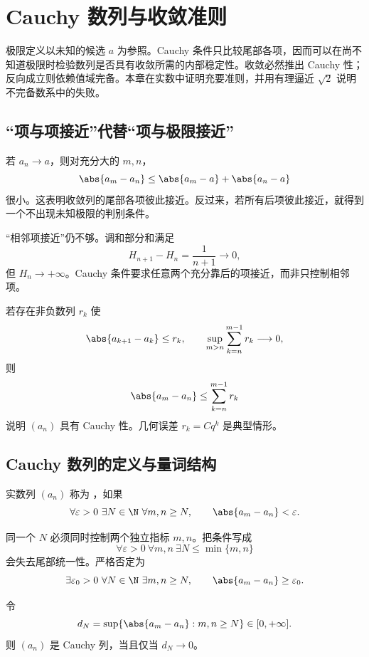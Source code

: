 \chapter{Cauchy 数列与收敛准则}
\label{chap:cauchy-criterion}

\begin{chapterguide}
极限定义以未知的候选 \(a\) 为参照。Cauchy 条件只比较尾部各项，因而可以在尚不知道极限时检验数列是否具有收敛所需的内部稳定性。收敛必然推出 Cauchy 性；反向成立则依赖值域完备。本章在实数中证明充要准则，并用有理逼近 \(\sqrt2\) 说明不完备数系中的失败。
\end{chapterguide}

\section{“项与项接近”代替“项与极限接近”}

若 \(a_n\to a\)，则对充分大的 \(m,n\)，
\[
 \abs{a_m-a_n}
 \le\abs{a_m-a}+\abs{a_n-a}
\]
很小。这表明收敛列的尾部各项彼此接近。反过来，若所有后项彼此接近，就得到一个不出现未知极限的判别条件。

“相邻项接近”仍不够。调和部分和满足
\[
 H_{n+1}-H_n=\frac1{n+1}\to0,
\]
但 \(H_n\to+\infty\)。Cauchy 条件要求任意两个充分靠后的项接近，而非只控制相邻项。

\begin{example}
若存在非负数列 \(r_k\) 使
\[
 \abs{a_{k+1}-a_k}\le r_k,\qquad
 \sup_{m>n}\sum_{k=n}^{m-1}r_k\longrightarrow0,
\]
则
\[
 \abs{a_m-a_n}\le\sum_{k=n}^{m-1}r_k
\]
说明 \((a_n)\) 具有 Cauchy 性。几何误差 \(r_k=Cq^k\) 是典型情形。
\end{example}

\section{Cauchy 数列的定义与量词结构}

\begin{definition}
实数列 \((a_n)\) 称为 ，如果
\[
 \forall\varepsilon>0\ \exists N\in\N\
 \forall m,n\ge N,\qquad
 \abs{a_m-a_n}<\varepsilon.
\]
\end{definition}

同一个 \(N\) 必须同时控制两个独立指标 \(m,n\)。把条件写成
\[
 \forall\varepsilon>0\ \forall m,n\ \exists N\le\min\{m,n\}
\]
会失去尾部统一性。严格否定为
\[
 \exists\varepsilon_0>0\ \forall N\in\N\
 \exists m,n\ge N,\qquad
 \abs{a_m-a_n}\ge\varepsilon_0.
\]

\begin{proposition}[尾部直径刻画]
令
\[
 d_N=\sup\{\abs{a_m-a_n}:m,n\ge N\}\in[0,+\infty].
\]
则 \((a_n)\) 是 Cauchy 列，当且仅当 \(d_N\to0\)。
\end{proposition}

